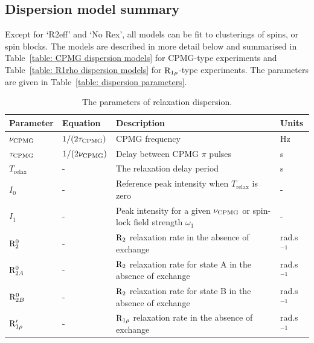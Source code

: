 \subsection{Dispersion model summary}

Except for `R2eff' and `No Rex', all models can be fit to clusterings of spins, or spin blocks.
The models are described in more detail below and summarised in Table~\ref{table: CPMG dispersion models} for CPMG-type experiments and Table~\ref{table: R1rho dispersion models} for $\mathrm{R}_{1\rho}$-type experiments.
The parameters are given in Table~\ref{table: dispersion parameters}.

\begin{table}
\begin{center}
\caption{The parameters of relaxation dispersion.}
\begin{tabular}{llll}
\toprule
Parameter               & Equation              & Description                                                                   & Units \\
\midrule
$\nu_\textrm{CPMG}$               & $1 / (2 \tau_\textrm{CPMG})$    & CPMG frequency                                                                & Hz \\
$\tau_\textrm{CPMG}$              & $1 / (2 \nu_\textrm{CPMG})$     & Delay between CPMG $\pi$ pulses                                               & s \\
$T_\textrm{relax}$      & -                     & The relaxation delay period                                                   & s \\
$I_0$                   & -                     & Reference peak intensity when $T_\textrm{relax}$ is zero                      & - \\
$I_1$                   & -                     & Peak intensity for a given $\nu_\textrm{CPMG}$ or spin-lock field strength $\omega_1$   & - \\
$\mathrm{R}_2^0$             & -                     & $\mathrm{R}_2$ relaxation rate in the absence of exchange                            & rad.s$^{-1}$ \\
$\mathrm{R}_{2A}^0$            & -                     & $\mathrm{R}_2$ relaxation rate for state A in the absence of exchange                & rad.s$^{-1}$ \\
$\mathrm{R}_{2B}^0$            & -                     & $\mathrm{R}_2$ relaxation rate for state B in the absence of exchange                & rad.s$^{-1}$ \\
$\mathrm{R}_{1\rho}'$         & -                     & $\mathrm{R}_{1\rho}$ relaxation rate in the absence of exchange                         & rad.s$^{-1}$ \\

\end{tabular}
\end{center}
\end{table}
